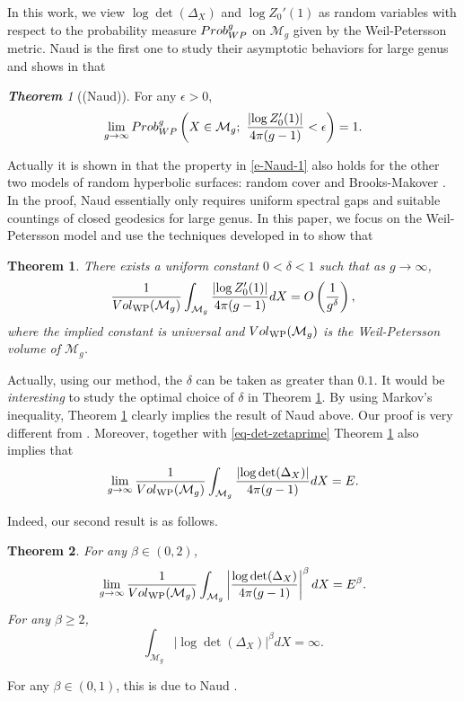 \documentclass[11pt]{amsart}
\newcommand{\sM}{\mathcal{M}}
\newcommand{\eps}{\epsilon}
\def\Vol{\mathop{\rm Vol}}
\def\Prob{\mathop{\rm Prob}\nolimits_{\rm WP}^g}
\theoremstyle{plain}
\newtheorem{theorem}{Theorem}
\newcommand{\be}{\begin{equation}}
\newcommand{\ene}{\end{equation}}
\theoremstyle{definition}
\theoremstyle{remark}
\newtheorem*{thm*}{\bf Theorem}
\begin{document}
In this work, we view $\log \det (\Delta_X)$ and $\log Z_0'(1)$ as random variables with respect to the probability measure $\Prob$ on $\sM_g$ given by the Weil-Petersson metric. Naud is the first one to study their asymptotic behaviors for large genus and shows in \cite{naud2023determinants} that

\begin{thm*}[(Naud)]
For any $\eps>0$,
\be\label{e-Naud-1}
\lim\limits_{g\to \infty}\Prob\left(X\in \sM_g; \ \frac{\left| \log Z_0^\prime(1) \right|}{4\pi(g-1)}<\eps\right)=1.
\ene
\end{thm*}

\noindent Actually it is shown in \cite{naud2023determinants} that the property in \eqref{e-Naud-1} also holds for the other two models of random hyperbolic surfaces: random cover \cite{MN20, MNP20} and Brooks-Makover \cite{BM04}. In the proof, Naud essentially only requires uniform spectral gaps and suitable countings of closed geodesics for large genus. In this paper, we focus on the Weil-Petersson model and use the techniques developed in \cite{nie2023large,wu2022random} to show that 
 \begin{theorem}\label{mainthm2}
     There exists a uniform constant $0<\delta<1$ such that  as $g\to\infty$,   
\[\frac{1}{\Vol_{\mathrm{WP}}(\sM_g)}\int_{\sM_g}\frac{\left| \log Z_0^\prime(1) \right|}{4\pi(g-1)} dX=O\left(\frac{1}{g^{\delta}}\right),\]
where the implied constant is universal and $\Vol_{\mathrm{WP}}(\sM_g)$ is the Weil-Petersson volume of $\sM_g$.
 \end{theorem}
\noindent Actually, using our method, the $\delta$ can be taken as greater than $0.1$. It would be \emph{interesting} to study the optimal choice of $\delta$ in Theorem \ref{mainthm2}. By using Markov's inequality, Theorem \ref{mainthm2} clearly implies the result of Naud above. Our proof is very different from \cite{naud2023determinants}. Moreover, together with \eqref{eq-det-zetaprime} Theorem \ref{mainthm2} also implies that
\[\lim\limits_{g\to \infty}\frac{1}{\Vol_{\mathrm{WP}}(\sM_g)}\int_{\sM_g}\frac{\left| \log \det (\Delta_X) \right|}{4\pi(g-1)} dX=E.\]

Indeed, our second result is as follows.
 \begin{theorem}\label{mainthm1}
For any $\beta\in (0,2)$,
\[\lim\limits_{g\to \infty} \frac{1}{\Vol_{\mathrm{WP}}(\sM_g)}\int_{\sM_g}\left|\frac{\log\det (\Delta_X)}{4\pi(g-1)}\right|^\beta dX=E^\beta.\]
For any $\beta\geq 2$,
\[\int_{\sM_g}\left|\log\det (\Delta_X)\right|^\beta dX=\infty.\]
 \end{theorem}
\noindent For any $\beta\in (0,1)$, this is due to Naud \cite{naud2023determinants}.
\end{document}
